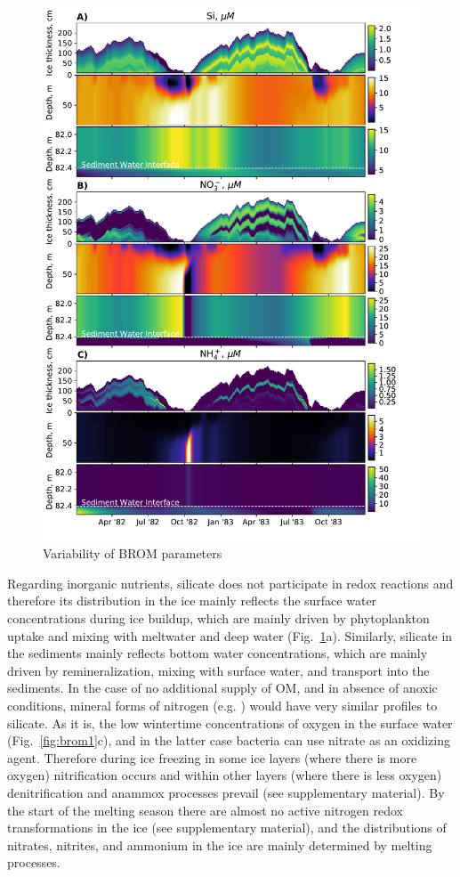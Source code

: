 \documentclass[gmd, manuscript]{copernicus}
\begin{document}
\begin{figure}[htbp]
\includegraphics[width=13.6cm]{fig05_2}
\caption{Variability of \textrm{BROM} parameters}
\label{fig:brom2}
\end{figure}

Regarding inorganic nutrients, silicate does not participate in redox reactions and therefore its distribution in the ice mainly reflects the surface water concentrations during ice buildup, which are mainly driven by phytoplankton uptake and mixing with meltwater and deep water (Fig.~\ref{fig:brom2}a).
Similarly, silicate in the sediments mainly reflects bottom water concentrations, which are mainly driven by remineralization, mixing with surface water, and transport into the sediments.
In the case of no additional supply of \textrm{OM}, and in absence of anoxic conditions, mineral forms of nitrogen (e.g. ) would have very similar profiles to silicate.
As it is, the low wintertime concentrations of oxygen in the surface water (Fig.~\ref{fig:brom1}c), and in the latter case bacteria can use nitrate as an oxidizing agent.
Therefore during ice freezing in some ice layers (where there is more oxygen) nitrification occurs and within other layers (where there is less oxygen) denitrification and anammox processes prevail (see supplementary material).
By the start of the melting season there are almost no active nitrogen redox transformations in the ice (see supplementary material), and the distributions of nitrates, nitrites, and ammonium in the ice are mainly determined by melting processes.
\end{document}
